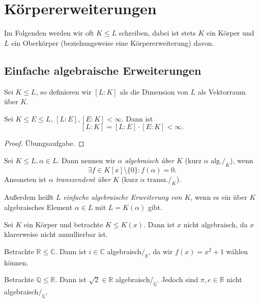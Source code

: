 \section{Körpererweiterungen}

Im Folgenden werden wir oft $K \leq L$ schreiben, dabei ist stets $K$ ein Körper und $L$ ein Oberkörper (beziehungsweise eine Körpererweiterung) davon.

\subsection{Einfache algebraische Erweiterungen}

\begin{definition}
    Sei $K \leq L$, so definieren wir $[L:K]$ als die Dimension von $L$ als Vektorraum über $K$.
\end{definition}

\begin{theorem}[Gradsatz]
    Sei $K \leq E \leq L$, $[L:E],[E:K] < \infty$. Dann ist
    $$ [L:K] = [L:E] \cdot [E:K] < \infty. $$
\end{theorem}

\begin{proof}
    Übungsaufgabe.
\end{proof}

\begin{definition}
    Sei $K \leq L, \alpha \in L$. Dann nennen wir \emph{$\alpha$ algebraisch über $K$} (kurz $\alpha \text{ alg.}/_K$), wenn
    $$ \exists f \in K[x] \setminus \{0\}: f(\alpha) = 0. $$
    Ansonsten ist \emph{$\alpha$ transzendent über $K$} (kurz $\alpha \text { transz.}/_K$).

    Außerdem heißt $L$ \emph{einfache algebraische Erweiterung von $K$}, wenn es ein über $K$ algebraisches Element $\alpha\in L$ mit $L=K(\alpha)$ gibt.
\end{definition}

\begin{example}
    Sei $K$ ein Körper und betrachte $K \leq K(x)$. Dann ist $x$ nicht algebraisch, da $x$ klarerweise nicht annullierbar ist.
\end{example}

\begin{example}
    Betrachte $\mathbb{R} \leq \mathbb{C}$. Dann ist $i \in \mathbb{C}$ algebraisch$/_\mathbb{R}$, da wir $f(x) = x^2 + 1$ wählen können.
\end{example}

\begin{example}
    Betrachte $\mathbb{Q} \leq \mathbb{R}$. Dann ist $\sqrt{2} \in \mathbb{R}$ algebraisch$/_\mathbb{Q}$. Jedoch sind $\pi, e \in \mathbb{R}$ nicht algebraisch$/_\mathbb{Q}$.
\end{example}

